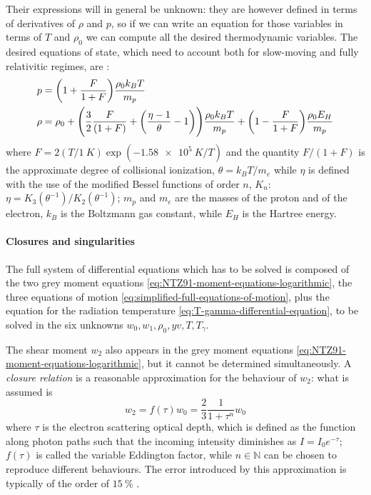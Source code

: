 \documentclass[main.tex]{subfiles}
\begin{document}
Their expressions will in general be unknown: they are however defined in terms of derivatives of \(\rho\) and \(p\), so if we can write an equation for those variables in terms of \(T\) and \(\rho_0\) we can compute all the desired thermodynamic variables. The desired equations of state, which need to account both for slow-moving and fully relativitic regimes, are \cite[eqs. 16]{NobiliTurollaZampieri:1991dec}:
%
\begin{subequations}
\begin{align}
  p &= \qty(1 + \frac{F}{1+F}) \frac{\rho_0 k_B T}{m_p}  \\
  \rho &= \rho_0 +  \qty( \frac{3}{2} \frac{F}{(1+F)} + \qty(\frac{\eta-1}{\theta} - 1)) \frac{\rho_0 k_B T}{m_p} + \qty(1 - \frac{F}{1+F} ) \frac{\rho_0 E_H}{m_p}
\end{align}
\end{subequations}
%
where \(F = 2 (T/\SI{1}{K}) \exp(\SI{-1.58e5}{K}/T)\) and the quantity \(F/(1+F)\) is the approximate degree of collisional ionization, \(\theta = k_B T / m_e\) while \(\eta\) is defined with the use of the modified Bessel functions of order \(n\), \(K_n\):  \(\eta = K_3 (\theta^{-1}) / K_2 (\theta^{-1})\); \(m_p\) and \(m_e\) are the masses of the proton and of the electron, \(k_B\) is the Boltzmann gas constant, while \(E_H\) is the Hartree energy.

\paragraph{Closures and singularities} \label{sec:closures-singularities}

The full system of differential equations which has to be solved is composed of the two grey moment equations \eqref{eq:NTZ91-moment-equations-logarithmic}, the three equations of motion \eqref{eq:simplified-full-equations-of-motion}, plus the equation for the radiation temperature \eqref{eq:T-gamma-differential-equation}, to be solved in the six unknowns \(w_0, w_1, \rho_0, yv, T, T_\gamma\).

The shear moment \(w_2\) also appears in the grey moment equations \eqref{eq:NTZ91-moment-equations-logarithmic}, but it cannot be determined simultaneously. A \emph{closure relation} is a reasonable approximation for the behaviour of \(w_2\): what is assumed is
%
\begin{equation}
  w_2 = f(\tau) w_0 = \frac{2}{3} \frac{1}{1+ \tau^n} w_0
\end{equation}
%
where \(\tau\) is the electron scattering optical depth, which is defined \cite[eqs. 1.25, 1.26]{RybickiLightman:2004} as the function along photon paths such that the incoming intensity diminishes as \(I = I_0 e^{-\tau}\); \(f(\tau)\) is called the variable Eddington factor, while \(n \in \mathbb N\) can be chosen to reproduce different behaviours.
The error introduced by this approximation is typically of the order of \(\SI{15}{\percent}\) \cite[]{TurollaNobili:1988}.
\end{document}
